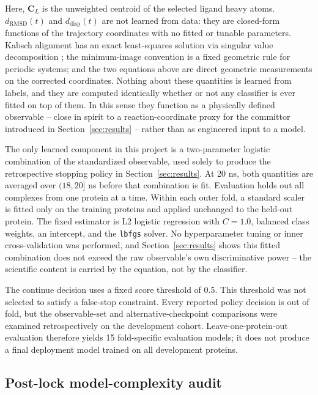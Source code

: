 \documentclass[11pt]{article}
\begin{document}
Here, $\mathbf C_L$ is the unweighted centroid of the selected ligand heavy atoms. $d_{\mathrm{RMSD}}(t)$ and $d_{\mathrm{disp}}(t)$ are not learned from data: they are closed-form functions of the trajectory coordinates with no fitted or tunable parameters. Kabsch alignment has an exact least-squares solution via singular value decomposition \cite{kabsch1976}; the minimum-image convention is a fixed geometric rule for periodic systems; and the two equations above are direct geometric measurements on the corrected coordinates. Nothing about these quantities is learned from labels, and they are computed identically whether or not any classifier is ever fitted on top of them. In this sense they function as a physically defined observable -- close in spirit to a reaction-coordinate proxy for the committor introduced in Section~\ref{sec:results} -- rather than as engineered input to a model.

The only learned component in this project is a two-parameter logistic combination of the standardized observable, used solely to produce the retrospective stopping policy in Section~\ref{sec:results}. At 20 ns, both quantities are averaged over $(18,20]$ ns before that combination is fit. Evaluation holds out all complexes from one protein at a time. Within each outer fold, a standard scaler is fitted only on the training proteins and applied unchanged to the held-out protein. The fixed estimator is L2 logistic regression with $C=1.0$, balanced class weights, an intercept, and the \texttt{lbfgs} solver. No hyperparameter tuning or inner cross-validation was performed, and Section~\ref{sec:results} shows this fitted combination does not exceed the raw observable's own discriminative power -- the scientific content is carried by the equation, not by the classifier.

The continue decision uses a fixed score threshold of 0.5. This threshold was not selected to satisfy a false-stop constraint. Every reported policy decision is out of fold, but the observable-set and alternative-checkpoint comparisons were examined retrospectively on the development cohort. Leave-one-protein-out evaluation therefore yields 15 fold-specific evaluation models; it does not produce a final deployment model trained on all development proteins.

\subsection{Post-lock model-complexity audit}
\end{document}
